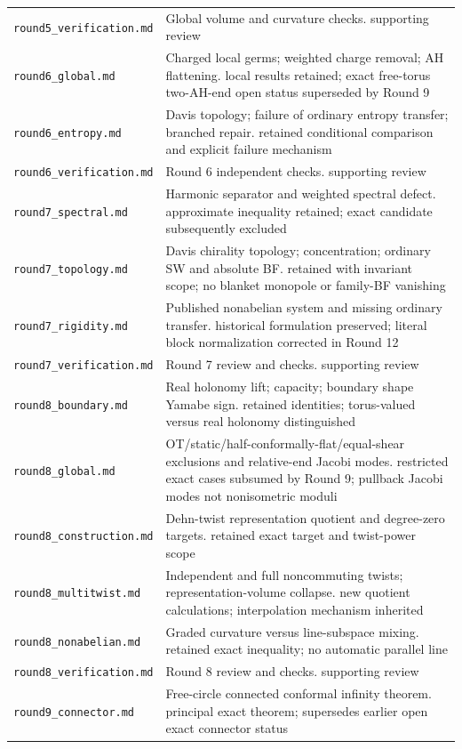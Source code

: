 \documentclass[UTF8,fontset=fandol,zihao=-4]{ctexart}
\theoremstyle{cn}
\begin{document}
\begin{longtable}{L{.34\textwidth}L{.59\textwidth}}
\nolinkurl{round5_verification.md} & Global volume and curvature checks. supporting review\\
\nolinkurl{round6_global.md} & Charged local germs; weighted charge removal; AH flattening. local results retained; exact free-torus two-AH-end open status superseded by Round 9\\
\nolinkurl{round6_entropy.md} & Davis topology; failure of ordinary entropy transfer; branched repair. retained conditional comparison and explicit failure mechanism\\
\nolinkurl{round6_verification.md} & Round 6 independent checks. supporting review\\
\nolinkurl{round7_spectral.md} & Harmonic separator and weighted spectral defect. approximate inequality retained; exact candidate subsequently excluded\\
\nolinkurl{round7_topology.md} & Davis chirality topology; concentration; ordinary SW and absolute BF. retained with invariant scope; no blanket monopole or family-BF vanishing\\
\nolinkurl{round7_rigidity.md} & Published nonabelian system and missing ordinary transfer. historical formulation preserved; literal block normalization corrected in Round 12\\
\nolinkurl{round7_verification.md} & Round 7 review and checks. supporting review\\
\nolinkurl{round8_boundary.md} & Real holonomy lift; capacity; boundary shape Yamabe sign. retained identities; torus-valued versus real holonomy distinguished\\
\nolinkurl{round8_global.md} & OT/static/half-conformally-flat/equal-shear exclusions and relative-end Jacobi modes. restricted exact cases subsumed by Round 9; pullback Jacobi modes not nonisometric moduli\\
\nolinkurl{round8_construction.md} & Dehn-twist representation quotient and degree-zero targets. retained exact target and twist-power scope\\
\nolinkurl{round8_multitwist.md} & Independent and full noncommuting twists; representation-volume collapse. new quotient calculations; interpolation mechanism inherited\\
\nolinkurl{round8_nonabelian.md} & Graded curvature versus line-subspace mixing. retained exact inequality; no automatic parallel line\\
\nolinkurl{round8_verification.md} & Round 8 review and checks. supporting review\\
\nolinkurl{round9_connector.md} & Free-circle connected conformal infinity theorem. principal exact theorem; supersedes earlier open exact connector status\\

\end{longtable}
\end{document}
